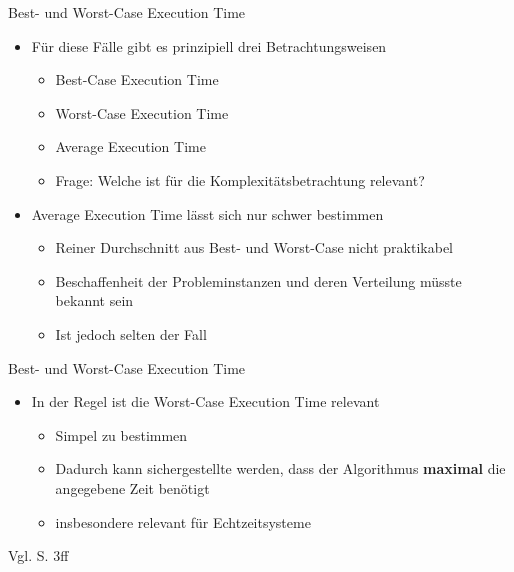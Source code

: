 \begin{frame}{Best- und Worst-Case Execution Time}
    \begin{itemize}[<+->]
        \item Für diese Fälle gibt es prinzipiell drei Betrachtungsweisen
        \begin{itemize}
            \item Best-Case Execution Time
            \item Worst-Case Execution Time
            \item Average Execution Time
            \item Frage: Welche ist für die Komplexitätsbetrachtung relevant?
        \end{itemize}
        \item Average Execution Time lässt sich nur schwer bestimmen
        \begin{itemize}
            \item Reiner Durchschnitt aus Best- und Worst-Case nicht praktikabel
            \item Beschaffenheit der Probleminstanzen und deren Verteilung müsste bekannt sein
            \item Ist jedoch selten der Fall
        \end{itemize}
    \end{itemize}
\end{frame}

\begin{frame}{Best- und Worst-Case Execution Time}
    \begin{itemize}
        \item In der Regel ist die Worst-Case Execution Time relevant
        \begin{itemize}
            \item Simpel zu bestimmen
            \item Dadurch kann sichergestellte werden, dass der Algorithmus \textbf{maximal} die angegebene Zeit benötigt
            \item insbesondere relevant für Echtzeitsysteme
        \end{itemize}
    \end{itemize}
Vgl. \cite{ottmann2017} S. 3ff
\end{frame}

